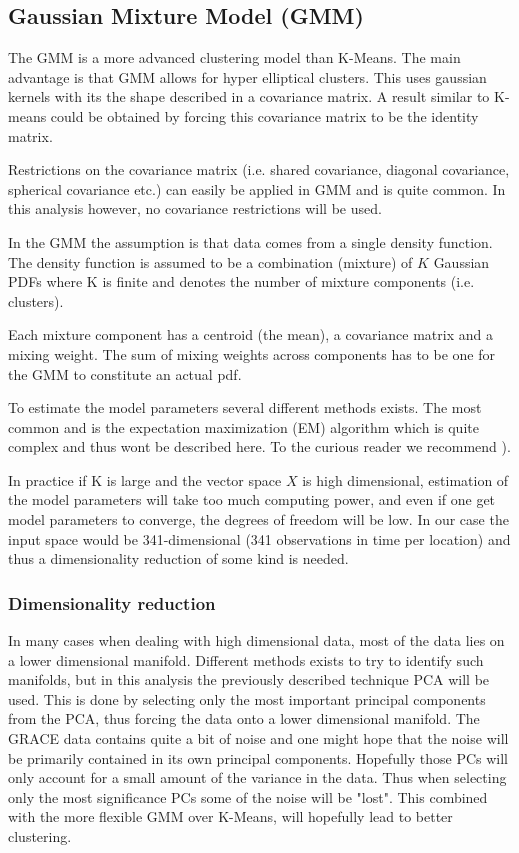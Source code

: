 \subsection{Gaussian Mixture Model (GMM)}
The GMM is a more advanced clustering model than K-Means. 
The main advantage is that GMM allows for hyper elliptical clusters. This uses gaussian kernels with its the shape described in a covariance matrix. A result similar to K-means could be obtained by forcing this covariance matrix to be the identity matrix.

Restrictions on the covariance matrix (i.e. shared covariance, diagonal covariance, spherical covariance etc.) can easily be applied in GMM and is quite common. In this analysis however, no covariance restrictions will be used.

In the GMM the assumption is that data comes from a single density function.
The density function is assumed to be a combination (mixture) of $K$ Gaussian PDFs where K is finite and denotes the number of mixture components (i.e. clusters).

Each mixture component has a centroid (the mean), a covariance matrix and a mixing weight.
The sum of mixing weights across components has to be one for the GMM to constitute an actual pdf.

To estimate the model parameters several different methods exists. The most common and is the expectation maximization (EM) algorithm which is quite complex and thus wont be described here. To the curious reader we recommend \cite[p.~214,272,463]{statistical-learning}).

In practice if K is large and the vector space $X$ is high dimensional, estimation of the model parameters will take too much computing power, and even if one get model parameters to converge, the degrees of freedom will be low.
In our case the input space would be 341-dimensional (341 observations in time per location) and thus a dimensionality reduction of some kind is needed. 

\subsubsection{Dimensionality reduction}
In many cases when dealing with high dimensional data, most of the data lies on a lower dimensional manifold. 
Different methods exists to try to identify such manifolds, but in this analysis the previously described technique PCA will be used. 
This is done by selecting only the most important principal components from the PCA, thus forcing the data onto a lower dimensional manifold.
The GRACE data contains quite a bit of noise and one might hope that the noise will be primarily contained in its own principal components. Hopefully those PCs will only account for a small amount of the variance in the data. 
Thus when selecting only the most significance PCs some of the noise will be "lost".
This combined with the more flexible GMM over K-Means, will hopefully lead to better clustering.
